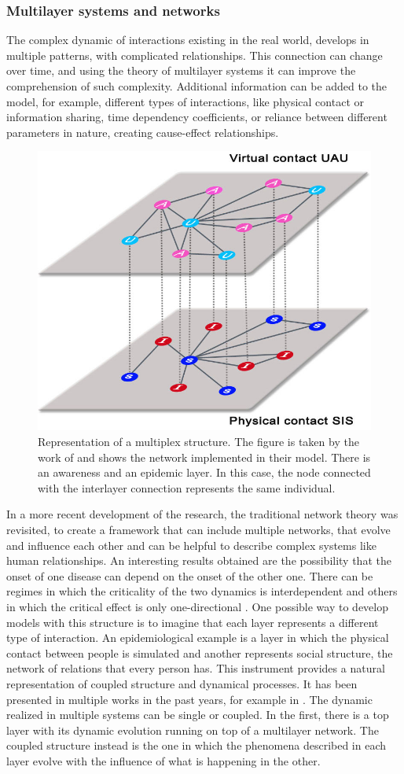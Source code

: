 \subsubsection{Multilayer systems and networks} 
The complex dynamic of interactions existing in the real world, develops in multiple patterns, with complicated relationships. This connection can change over time, and using the theory of multilayer systems it can improve the comprehension of such complexity. Additional information can be added to the model, for example, different types of interactions, like physical contact or information sharing, time dependency coefficients, or reliance between different parameters in nature, creating cause-effect relationships.
\begin{figure}[h]
	\centering
	\includegraphics[width=0.5\linewidth]{0_introduction/images_introduction/multi_layer}
	\caption[Multi-layer network]{Representation of a multiplex structure. The figure is taken by the work of \cite{Granell2013} and shows the network implemented in their model. There is an awareness and an epidemic layer. In this case, the node connected with the interlayer connection represents the same individual.}
	\label{fig:multilayer}
\end{figure} 
In a more recent development of the research, the traditional network theory was revisited, to create a framework that can include multiple networks, that evolve and influence each other \cite{DeDomenico2016, Krickel_2023} and can be helpful to describe complex systems like human relationships. An interesting results obtained are the possibility that the onset of one disease can depend on the onset of the other one. There can be regimes in which the criticality of the two dynamics is interdependent and others in which the critical effect is only one-directional \cite{DeDomenico2016}. 
One possible way to develop models with this structure is to imagine that each layer represents a different type of interaction. An epidemiological example is a layer in which the physical contact between people is simulated and another represents social structure, the network of relations that every person has. This instrument provides a natural representation of coupled structure and dynamical processes. It has been presented in multiple works in the past years, for example in \cite{Wang_2019}. The dynamic realized in multiple systems can be single or coupled. In the first, there is a top layer with its dynamic evolution running on top of a multilayer network. The coupled structure instead is the one in which the phenomena described in each layer evolve with the influence of what is happening in the other. 



